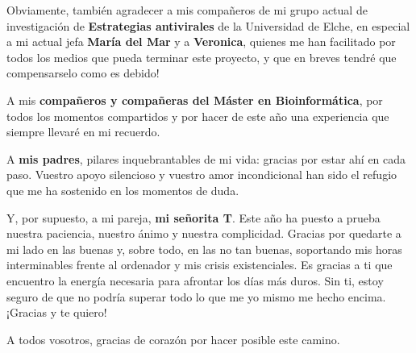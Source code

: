 \documentclass[10pt,a4paper]{article}
\begin{document}
Obviamente, también agradecer a mis compañeros de mi grupo actual de investigación de \textbf{Estrategias antivirales} de la Universidad de Elche, en especial a mi actual jefa \textbf{María del Mar} y a \textbf{Veronica}, quienes me han facilitado por todos los medios que pueda terminar este proyecto, y que en breves tendré que compensarselo como es debido!

A mis \textbf{compañeros y compañeras del Máster en Bioinformática}, por todos los momentos compartidos y por hacer de este año una experiencia que siempre llevaré en mi recuerdo.

A \textbf{mis padres}, pilares inquebrantables de mi vida: gracias por estar ahí en cada paso. Vuestro apoyo silencioso y vuestro amor incondicional han sido el refugio que me ha sostenido en los momentos de duda.

Y, por supuesto, a mi pareja, \textbf{mi señorita T}. Este año ha puesto a prueba nuestra paciencia, nuestro ánimo y nuestra complicidad. Gracias por quedarte a mi lado en las buenas y, sobre todo, en las no tan buenas, soportando mis horas interminables frente al ordenador y mis crisis existenciales. Es gracias a ti que encuentro la energía necesaria para afrontar los días más duros. Sin ti, estoy seguro de que no podría superar todo lo que me yo mismo me hecho encima. ¡Gracias y te quiero!

A todos vosotros, gracias de corazón por hacer posible este camino.


\newpage
\tableofcontents        %
\clearpage              %


\end{document}
